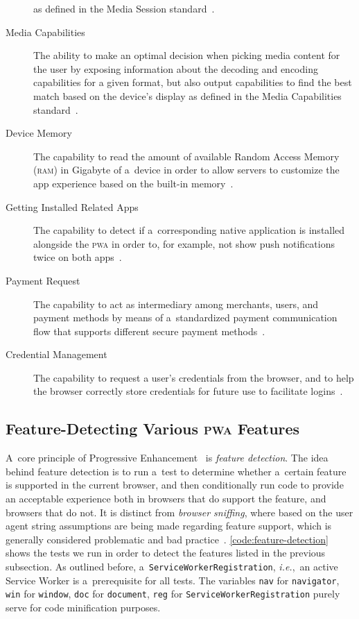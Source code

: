 \documentclass[sigconf]{acmart}
\begin{document}
\begin{description}
    as defined in the Media Session standard~\cite{lamouri2017mediasessionapi}.
  \item[Media Capabilities] The ability to make an optimal decision
    when picking media content for the user by exposing information
    about the decoding and encoding capabilities for a given format,
    but also output capabilities to find the best match based on the device's display
    as defined in the Media Capabilities standard~\cite{lamouri2017mediacapabilities}.
  \item[Device Memory] The capability to read the amount of available
    Random Access Memory (\textsc{ram}) in Gigabyte
    of a~device in order to allow servers to customize the app experience
    based on the built-in memory~\cite{panicker2017devicememory}.
  \item[Getting Installed Related Apps] The capability to detect if a~corresponding
    native application is installed alongside the \textsc{pwa} in order to,
    for example, not show push notifications twice on both apps~\cite{kinlan2017relatedapps}.
  \item[Payment Request] The capability to act as intermediary among merchants,
    users, and payment methods by means of a~standardized payment communication flow
    that supports different secure payment methods~\cite{bateman2017paymentrequest}.
  \item[Credential Management] The capability to request a user's credentials
    from the browser, and to help the browser correctly store credentials
    for future use to facilitate logins~\cite{west2017credentialmanagement}.
\end{description} 

\subsection{Feature-Detecting Various \textsc{pwa} Features}

A~core principle of Progressive Enhancement~\cite{champeon2003progressiveenhancement}
is \emph{feature detection}.
The idea behind feature detection is to run a~test to determine
whether a~certain feature is supported in the current browser,
and then conditionally run code to provide an acceptable experience
both in browsers that do support the feature, and browsers that do not.
It is distinct from \emph{browser sniffing}, where based on the user agent string
assumptions are being made regarding feature support,
which is generally considered problematic and bad practice~\cite{andersen2008useragent}.
\autoref{code:feature-detection} shows the tests
we run in order to detect the features listed in the previous subsection.
As outlined before, a~\texttt{ServiceWorkerRegistration},
\emph{i.e.},\ an active Service Worker is a~prerequisite for all tests.  
The variables \texttt{nav} for \texttt{navigator},
\texttt{win} for \texttt{window}, \texttt{doc} for \texttt{document},
\texttt{reg} for \texttt{ServiceWorkerRegistration}
purely serve for code minification purposes.
\end{document}
